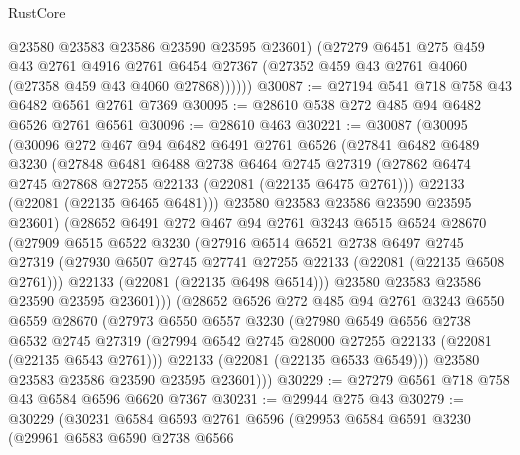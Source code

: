 \begin{lexlean}{RustCore}
\begin{coremodule}
            @23580
            @23583
            @23586
            @23590
            @23595
            @23601)
          (@27279
            @6451
            @275
            @459
            @43
            @2761
            @4916
            @2761
            @6454
            @27367
            (@27352 @459 @43 @2761 @4060 (@27358 @459 @43 @4060 @27868))))))
@30087 := @27194 @541 @718 @758 @43 @6482 @6561 @2761 @7369
@30095 := @28610 @538 @272 @485 @94 @6482 @6526 @2761 @6561
@30096 := @28610 @463
@30221 := @30087
    (@30095
      (@30096
        @272
        @467
        @94
        @6482
        @6491
        @2761
        @6526
        (@27841
          @6482
          @6489
          @3230
          (@27848
            @6481
            @6488
            @2738
            @6464
            @2745
            @27319
            (@27862 @6474 @2745 @27868 @27255 @22133 (@22081 (@22135 @6475 @2761)))
            @22133
            (@22081 (@22135 @6465 @6481)))
          @23580
          @23583
          @23586
          @23590
          @23595
          @23601)
        (@28652
          @6491
          @272
          @467
          @94
          @2761
          @3243
          @6515
          @6524
          @28670
          (@27909
            @6515
            @6522
            @3230
            (@27916
              @6514
              @6521
              @2738
              @6497
              @2745
              @27319
              (@27930 @6507 @2745 @27741 @27255 @22133 (@22081 (@22135 @6508 @2761)))
              @22133
              (@22081 (@22135 @6498 @6514)))
            @23580
            @23583
            @23586
            @23590
            @23595
            @23601)))
      (@28652
        @6526
        @272
        @485
        @94
        @2761
        @3243
        @6550
        @6559
        @28670
        (@27973
          @6550
          @6557
          @3230
          (@27980
            @6549
            @6556
            @2738
            @6532
            @2745
            @27319
            (@27994 @6542 @2745 @28000 @27255 @22133 (@22081 (@22135 @6543 @2761)))
            @22133
            (@22081 (@22135 @6533 @6549)))
          @23580
          @23583
          @23586
          @23590
          @23595
          @23601)))
@30229 := @27279 @6561 @718 @758 @43 @6584 @6596 @6620 @7367
@30231 := @29944 @275 @43
@30279 := @30229
    (@30231
      @6584
      @6593
      @2761
      @6596
      (@29953
        @6584
        @6591
        @3230
        (@29961
          @6583
          @6590
          @2738
          @6566

\end{coremodule}
\end{lexlean}
